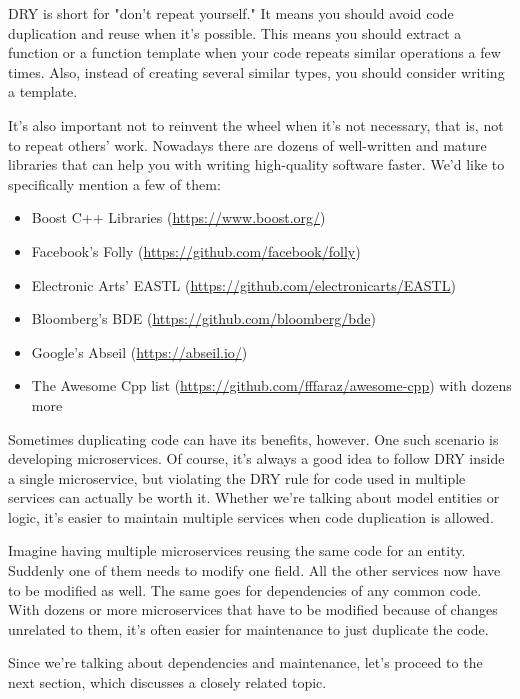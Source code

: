 
DRY is short for "don't repeat yourself." It means you should avoid code duplication and reuse when it's possible. This means you should extract a function or a function template when your code repeats similar operations a few times. Also, instead of creating several similar types, you should consider writing a template.

It's also important not to reinvent the wheel when it's not necessary, that is, not to repeat others' work. Nowadays there are dozens of well-written and mature libraries that can help you with writing high-quality software faster. We'd like to specifically mention a few of them:


\begin{itemize}
\item Boost C++ Libraries (\url{https://www.boost.org/})
\item Facebook's Folly (\url{https://github.com/facebook/folly})
\item Electronic Arts' EASTL (\url{https://github.com/electronicarts/EASTL})
\item Bloomberg's BDE (\url{https://github.com/bloomberg/bde})
\item Google's Abseil (\url{https://abseil.io/})
\item The Awesome Cpp list (\url{https://github.com/fffaraz/awesome-cpp}) with
dozens more

\end{itemize}

Sometimes duplicating code can have its benefits, however. One such scenario is developing microservices. Of course, it's always a good idea to follow DRY inside a single microservice, but violating the DRY rule for code used in multiple services can actually be worth it. Whether we're talking about model entities or logic, it's easier to maintain multiple services when code duplication is allowed.

Imagine having multiple microservices reusing the same code for an entity. Suddenly one of them needs to modify one field. All the other services now have to be modified as well. The same goes for dependencies of any common code. With dozens or more microservices that have to be modified because of changes unrelated to them, it's often easier for maintenance to just duplicate the code.

Since we're talking about dependencies and maintenance, let's proceed to the next section, which discusses a closely related topic.








